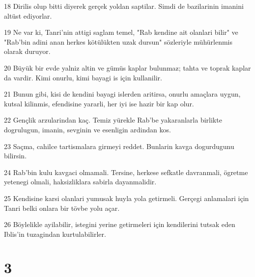 \par 18 Dirilis olup bitti diyerek gerçek yoldan saptilar. Simdi de bazilarinin imanini altüst ediyorlar.
\par 19 Ne var ki, Tanri'nin attigi saglam temel, "Rab kendine ait olanlari bilir" ve "Rab'bin adini anan herkes kötülükten uzak dursun" sözleriyle mühürlenmis olarak duruyor.
\par 20 Büyük bir evde yalniz altin ve gümüs kaplar bulunmaz; tahta ve toprak kaplar da vardir. Kimi onurlu, kimi bayagi is için kullanilir.
\par 21 Bunun gibi, kisi de kendini bayagi islerden aritirsa, onurlu amaçlara uygun, kutsal kilinmis, efendisine yararli, her iyi ise hazir bir kap olur.
\par 22 Gençlik arzularindan kaç. Temiz yürekle Rab'be yakaranlarla birlikte dogrulugun, imanin, sevginin ve esenligin ardindan kos.
\par 23 Saçma, cahilce tartismalara girmeyi reddet. Bunlarin kavga dogurdugunu bilirsin.
\par 24 Rab'bin kulu kavgaci olmamali. Tersine, herkese sefkatle davranmali, ögretme yetenegi olmali, haksizliklara sabirla dayanmalidir.
\par 25 Kendisine karsi olanlari yumusak huyla yola getirmeli. Gerçegi anlamalari için Tanri belki onlara bir tövbe yolu açar.
\par 26 Böylelikle ayilabilir, istegini yerine getirmeleri için kendilerini tutsak eden Iblis'in tuzagindan kurtulabilirler.

\chapter{3}

